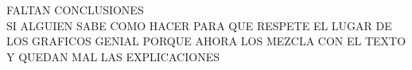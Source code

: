 {\huge FALTAN CONCLUSIONES
}\\


{\huge SI ALGUIEN SABE COMO HACER PARA QUE RESPETE EL LUGAR DE LOS GRAFICOS GENIAL PORQUE AHORA LOS MEZCLA CON EL TEXTO Y QUEDAN MAL LAS EXPLICACIONES
}\\


%
%
%
%
%
%
%
